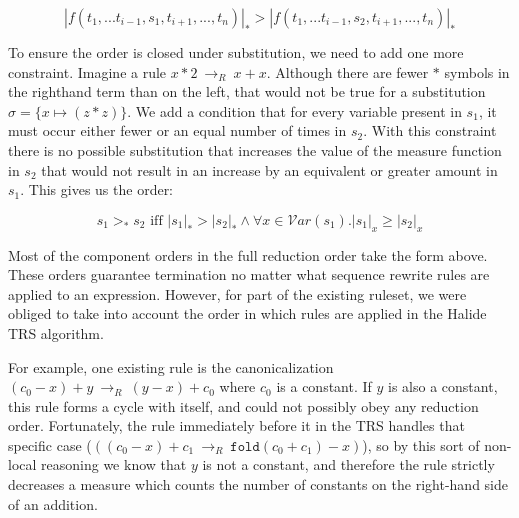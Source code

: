 \documentclass[acmsmall]{acmart}\settopmatter{}
\newcommand{\rewrites}[0]{\:\rightarrow_{R}\:}
\begin{document}
\[
|f(t_1,...t_{i-1},s_1,t_{i+1},...,t_n)|_* > |f(t_1,...t_{i-1},s_2,t_{i+1},...,t_n)|_*
\]

To ensure the order is closed under substitution, we need to add one more constraint. Imagine a rule $x * 2 \rewrites x + x$. Although there are fewer $*$ symbols in the righthand term than on the left, that would not be true for a substitution $\sigma = \{x \mapsto (z * z)\}$. We add a condition that for every variable present in $s_1$, it must occur either fewer or an equal number of times in $s_2$. With this constraint there is no possible substitution that increases the value of the measure function in $s_2$ that would not result in an increase by an equivalent or greater amount in $s_1$. This gives us the order:

\[
s_1 >_* s_2 \textrm{ iff } |s_1|_* > |s_2|_* \wedge \forall x \in \mathcal{V}ar(s_1) . |s_1|_x \geq |s_2|_x
\]

Most of the component orders in the full reduction order take the form above. These orders guarantee termination no matter what sequence rewrite rules are applied to an expression. However, for part of the existing ruleset, we were obliged to take into account the order in which rules are applied in the Halide TRS algorithm.

For example, one existing rule is the canonicalization $(c_0 - x) + y \rewrites (y - x) + c_0$ where $c_0$ is a constant. If $y$ is also a constant, this rule forms a cycle with itself, and could not possibly obey any reduction order. Fortunately, the rule immediately before it in the TRS handles that specific case ($((c_0 - x) + c_1 \rewrites \texttt{fold}(c_0 + c_1) - x)$), so by this sort of non-local reasoning we know that $y$ is not a constant, and therefore the rule strictly decreases a measure which counts the number of constants on the right-hand side of an addition.


\end{document}
